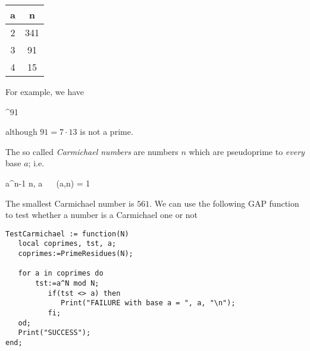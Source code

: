 \vspace{3mm}

\begin{tabular}{|c|c|} \hline
  a & n  \\ \hline
  2 & 341 \\
  3 & 91 \\
  4 & 15 \\ \hline
\end{tabular}

\vspace{3mm}

For example, we have

^{91}  
\eee

although $91 = 7 \cdot 13$ is not a prime.

The so called \emph{Carmichael numbers} are numbers $n$ which are pseudoprime to \emph{every} base $a$; i.e.

\bee
a^{n-1}  \mod n, \forall a \,\,  \,\, \gcd(a,n) = 1
\eee

The smallest Carmichael number is $561$. We can use the following GAP function to test whether a number is a Carmichael one or not

\begin{verbatim}
TestCarmichael := function(N)
   local coprimes, tst, a;
   coprimes:=PrimeResidues(N);

   for a in coprimes do
       tst:=a^N mod N;
          if(tst <> a) then
             Print("FAILURE with base a = ", a, "\n");
          fi;
   od;
   Print("SUCCESS");
end;
\end{verbatim}



